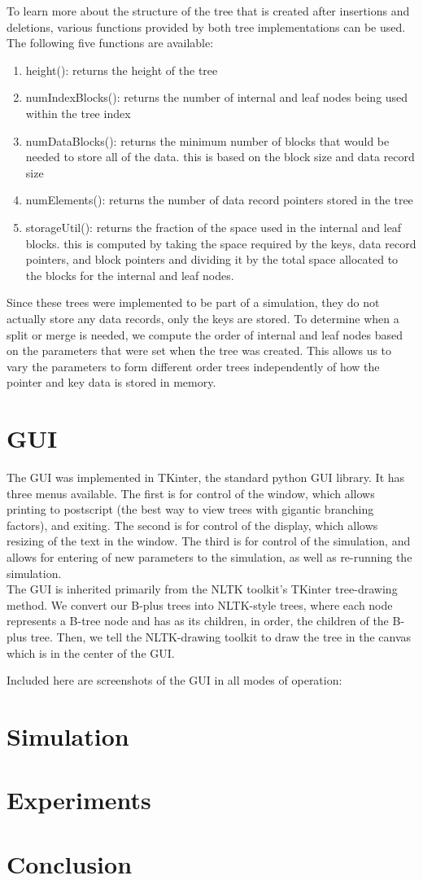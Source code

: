 \documentclass[fleqn]{article}
\begin{document}
To learn more about the structure of the tree that is created after insertions and deletions, various functions provided by both tree implementations can be used.  The following five functions are available:
\begin{enumerate}
\item
height():  returns the height of the tree
\item
numIndexBlocks(): returns the number of internal and leaf nodes being used within the tree index
\item
numDataBlocks(): returns the minimum number of blocks that would be needed to store all of the data.  this is based on the block size and data record size
\item
numElements(): returns the number of data record pointers stored in the tree
\item
storageUtil(): returns the fraction of the space used in the internal and leaf blocks.  this is computed by taking the space required by the keys, data record pointers, and block pointers and dividing it by the total space allocated to the blocks for the internal and leaf nodes.
\end{enumerate}
Since these trees were implemented to be part of a simulation, they do not actually store any data records, only the keys are stored.  To determine when a split or merge is needed, we compute the order of internal and leaf nodes based on the parameters that were set when the tree was created.  This allows us to vary the parameters to form different order trees independently of how the pointer and key data is stored in memory.

\section{GUI}

The GUI was implemented in TKinter, the standard python GUI library.  It has three menus available.  The first is for control of the window, which allows printing to postscript (the best way to view trees with gigantic branching factors), and exiting.  The second is for control of the display, which allows resizing of the text in the window.  The third is for control of the simulation, and allows for entering of new parameters to the simulation, as well as re-running the simulation.\\

The GUI is inherited primarily from the NLTK toolkit's TKinter tree-drawing method.  We convert our B-plus trees into NLTK-style trees, where each node represents a B-tree node and has as its children, in order, the children of the B-plus tree.  Then, we tell the NLTK-drawing toolkit to draw the tree in the canvas which is in the center of the GUI.

Included here are screenshots of the GUI in all modes of operation:



\section{Simulation}


\section{Experiments}

\section{Conclusion}
\end{document}
